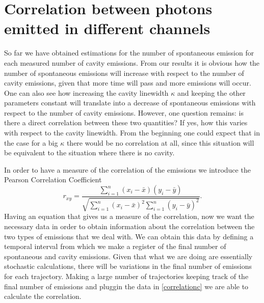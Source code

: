 \documentclass[conference]{IEEEtran}
\begin{document}
\section{Correlation between photons emitted in different channels}\label{sc:correlation}
So far we have obtained estimations for the number of spontaneous emission for each measured number of cavity emissions. From our results it is obvious how the number of spontaneous emissions will increase with respect to the number of cavity emissions, given that more time will pass and more emissions will occur. One can also see how increasing the cavity linewidth $\kappa$ and keeping the other parameters constant will translate into a decrease of spontaneous emissions with respect to the number of cavity emissions. However, one question remains: is there a direct correlation between these two quantities? If yes, how this varies with respect to the cavity linewidth. From the beginning one could expect that in the case for a big $\kappa$ there would be no correlation at all, since this situation will be equivalent to the situation where there is no cavity. 

In order to have a measure of the correlation of the emissions we introduce the Pearson Correlation Coefficient \cite{benesty2009pearson}
\begin{equation} 
r_{xy} = \frac{\sum\limits_{i=1}^n(x_i - \bar{x})(y_i - \bar{y})}{\sqrt{\sum\limits_{i=1}^n(x_i - \bar{x})^2\sum\limits_{i=1}^n(y_i - \bar{y})^2}}.  \label{correlationc}
\end{equation}
Having an equation that gives us a measure of the correlation, now we want the necessary data in order to obtain information about the correlation between the two types of emissions that we deal with. We can obtain this data by defining a temporal interval from which we make a register of the final number of spontaneous and cavity emissions. Given that what we are doing are essentially stochastic calculations, there will be variations in the final number of emissions for each trajectory. Making a large number of trajectories keeping track of the final number of emissions and pluggin the data in \eqref{correlationc} we are able to calculate the correlation.
\end{document}
